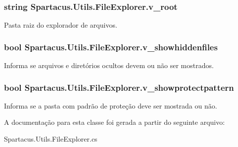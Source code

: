 \hypertarget{classSpartacus_1_1Utils_1_1FileExplorer_a398279cbdbce816d3c0d40b3dc02eb50}{
\subsubsection[{v\+\_\+root}]{\setlength{\rightskip}{0pt plus 5cm}string Spartacus.\+Utils.\+File\+Explorer.\+v\+\_\+root}}\label{classSpartacus_1_1Utils_1_1FileExplorer_a398279cbdbce816d3c0d40b3dc02eb50}


Pasta raiz do explorador de arquivos. 

\hypertarget{classSpartacus_1_1Utils_1_1FileExplorer_ac0811882d93d76fb122f8aad7ec7b15d}{
\subsubsection[{v\+\_\+showhiddenfiles}]{\setlength{\rightskip}{0pt plus 5cm}bool Spartacus.\+Utils.\+File\+Explorer.\+v\+\_\+showhiddenfiles}}\label{classSpartacus_1_1Utils_1_1FileExplorer_ac0811882d93d76fb122f8aad7ec7b15d}


Informa se arquivos e diretórios ocultos devem ou não ser mostrados. 

\hypertarget{classSpartacus_1_1Utils_1_1FileExplorer_adba2289bce9aadfdbb353f811fa0411c}{
\subsubsection[{v\+\_\+showprotectpattern}]{\setlength{\rightskip}{0pt plus 5cm}bool Spartacus.\+Utils.\+File\+Explorer.\+v\+\_\+showprotectpattern}}\label{classSpartacus_1_1Utils_1_1FileExplorer_adba2289bce9aadfdbb353f811fa0411c}


Informa se a pasta com padrão de proteção deve ser mostrada ou não. 



A documentação para esta classe foi gerada a partir do seguinte arquivo\+:\begin{DoxyCompactItemize}
\item 
Spartacus.\+Utils.\+File\+Explorer.\+cs\end{DoxyCompactItemize}
